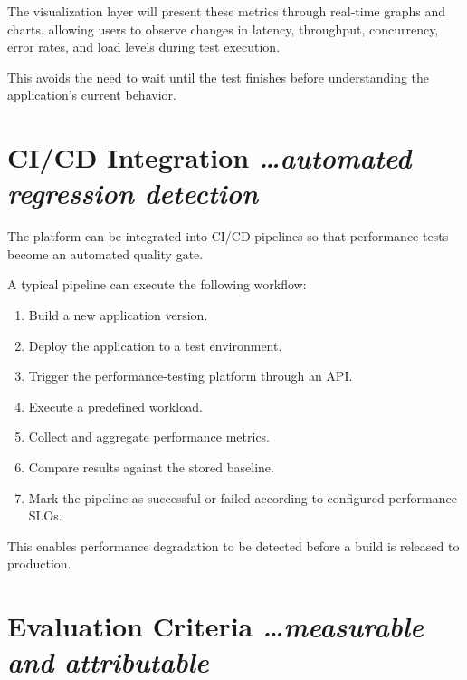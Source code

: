 \documentclass[11pt,a4paper]{article}
\newcommand{\BvrHint}[1]{%
  {\normalfont\normalsize\itshape\hfill #1}}
\begin{document}
The visualization layer will present these metrics through
real-time graphs and charts, allowing users to observe changes in
latency, throughput, concurrency, error rates, and load levels during
test execution.

This avoids the need to wait until the test finishes before
understanding the application's current behavior.

\section{CI/CD Integration%
  \BvrHint{\ldots automated regression detection}}

The platform can be integrated into CI/CD pipelines so that
performance tests become an automated quality gate.

A typical pipeline can execute the following workflow:

\begin{enumerate}[leftmargin=0.7cm]

    \item Build a new application version.

    \item Deploy the application to a test environment.

    \item Trigger the performance-testing platform through an API.

    \item Execute a predefined workload.

    \item Collect and aggregate performance metrics.

    \item Compare results against the stored baseline.

    \item Mark the pipeline as successful or failed according to
    configured performance SLOs.

\end{enumerate}

This enables performance degradation to be detected before a build is
released to production.

\section{Evaluation Criteria%
  \BvrHint{\ldots measurable and attributable}}
\end{document}
